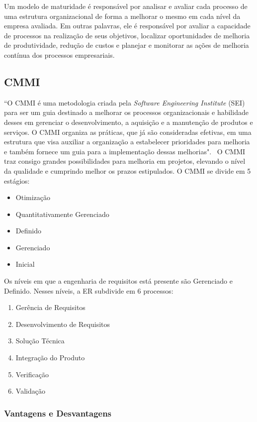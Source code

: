 Um modelo de maturidade é responsável por analisar e avaliar cada processo de uma estrutura organizacional de forma a melhorar o mesmo em cada nível da empresa avaliada. Em outras palavras, ele é responsável por avaliar a capacidade de processos na realização de seus objetivos, localizar oportunidades de melhoria de produtividade, redução de custos e planejar e monitorar as ações de melhoria contínua dos processos empresariais.

\subsection{CMMI}

“O CMMI é uma metodologia criada pela \textit{Software Engineering Institute} (SEI) para ser um guia destinado a melhorar os processos organizacionais e habilidade desses em gerenciar o desenvolvimento, a aquisição e a manutenção de produtos e serviços. O CMMI organiza as práticas, que já são consideradas efetivas, em uma estrutura que visa auxiliar a organização a estabelecer prioridades para melhoria e também fornece um guia para a implementação dessas melhorias".~\cite{dev3}
O CMMI traz consigo grandes possibilidades para melhoria em projetos, elevando o nível da qualidade e cumprindo melhor os prazos estipulados.
O CMMI se divide em 5 estágios:

\begin{itemize}
\item Otimização
\item Quantitativamente Gerenciado
\item Definido
\item Gerenciado
\item Inicial
\end{itemize}

Os níveis em que a engenharia de requisitos está presente são Gerenciado e Definido. Nesses níveis, a ER subdivide em 6 processos:

\begin{enumerate}
\item Gerência de Requisitos
\item Desenvolvimento de Requisitos
\item Solução Técnica
\item Integração do Produto
\item Verificação
\item Validação
\end{enumerate}

\subsubsection{Vantagens e Desvantagens}

